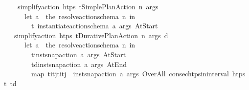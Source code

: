 \begin{isabellebody}
\ \ \ \ {\isachardoublequoteopen}simplify{\isacharunderscore}{\kern0pt}action\ htps\ {\isacharparenleft}{\kern0pt}t{\isacharcomma}{\kern0pt}Simple{\isacharunderscore}{\kern0pt}Plan{\isacharunderscore}{\kern0pt}Action\ n\ args{\isacharparenright}{\kern0pt}\ {\isacharequal}{\kern0pt}\ {\isacharparenleft}{\kern0pt}\isanewline
\ \ \ \ \ \ let\ a\ {\isacharequal}{\kern0pt}\ the\ {\isacharparenleft}{\kern0pt}resolve{\isacharunderscore}{\kern0pt}action{\isacharunderscore}{\kern0pt}schema\ n{\isacharparenright}{\kern0pt}\ in\isanewline
\ \ \ \ \ \ \ \ {\isacharbrackleft}{\kern0pt}{\isacharparenleft}{\kern0pt}t{\isacharcomma}{\kern0pt}\ instantiate{\isacharunderscore}{\kern0pt}action{\isacharunderscore}{\kern0pt}schema\ a\ args\ At{\isacharunderscore}{\kern0pt}Start{\isacharparenright}{\kern0pt}{\isacharbrackright}{\kern0pt}\isanewline
\ \ \ \ \ \ {\isacharparenright}{\kern0pt}{\isachardoublequoteclose}\isanewline
\ \ {\isacharbar}{\kern0pt}\ {\isachardoublequoteopen}simplify{\isacharunderscore}{\kern0pt}action\ htps\ {\isacharparenleft}{\kern0pt}t{\isacharcomma}{\kern0pt}Durative{\isacharunderscore}{\kern0pt}Plan{\isacharunderscore}{\kern0pt}Action\ n\ args\ d{\isacharparenright}{\kern0pt}\ {\isacharequal}{\kern0pt}\ {\isacharparenleft}{\kern0pt}\isanewline
\ \ \ \ \ \ let\ a\ {\isacharequal}{\kern0pt}\ the\ {\isacharparenleft}{\kern0pt}resolve{\isacharunderscore}{\kern0pt}action{\isacharunderscore}{\kern0pt}schema\ n{\isacharparenright}{\kern0pt}\ in\isanewline
\ \ \ \ \ \ \ \ {\isacharparenleft}{\kern0pt}t{\isacharcomma}{\kern0pt}inst{\isacharunderscore}{\kern0pt}snap{\isacharunderscore}{\kern0pt}action\ a\ args\ At{\isacharunderscore}{\kern0pt}Start{\isacharparenright}{\kern0pt}\ {\isacharhash}{\kern0pt}\ \isanewline
\ \ \ \ \ \ \ \ {\isacharparenleft}{\kern0pt}t{\isacharplus}{\kern0pt}d{\isacharcomma}{\kern0pt}inst{\isacharunderscore}{\kern0pt}snap{\isacharunderscore}{\kern0pt}action\ a\ args\ At{\isacharunderscore}{\kern0pt}End{\isacharparenright}{\kern0pt}\ {\isacharhash}{\kern0pt}\ \isanewline
\ \ \ \ \ \ \ \ {\isacharparenleft}{\kern0pt}map\ {\isacharparenleft}{\kern0pt}{\isasymlambda}{\isacharparenleft}{\kern0pt}t\isactrlsub i{\isacharcomma}{\kern0pt}t\isactrlsub j{\isacharparenright}{\kern0pt}{\isachardot}{\kern0pt}{\isacharparenleft}{\kern0pt}{\isacharparenleft}{\kern0pt}t\isactrlsub i{\isacharplus}{\kern0pt}t\isactrlsub j{\isacharparenright}{\kern0pt}\ {\isacharslash}{\kern0pt}\ {}{\isacharcomma}{\kern0pt}inst{\isacharunderscore}{\kern0pt}snap{\isacharunderscore}{\kern0pt}action\ a\ args\ Over{\isacharunderscore}{\kern0pt}All{\isacharparenright}{\kern0pt}{\isacharparenright}{\kern0pt}\ {\isacharparenleft}{\kern0pt}consec{\isacharunderscore}{\kern0pt}htps{\isacharunderscore}{\kern0pt}in{\isacharunderscore}{\kern0pt}interval\ htps\ t\ {\isacharparenleft}{\kern0pt}t{\isacharplus}{\kern0pt}d{\isacharparenright}{\kern0pt}{\isacharparenright}{\kern0pt}{\isacharparenright}{\kern0pt}\isanewline

\end{isabellebody}
